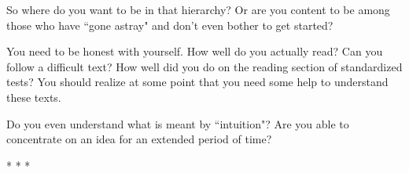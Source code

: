 So where do you want to be in that hierarchy? Or are you content to be among those who have ``gone astray" and don't even bother to get started?

You need to be honest with yourself. How well do you actually read? Can you follow a difficult text? How well did you do on the reading section of standardized tests? You should realize at some point that you need some help to understand these texts.

Do you even understand what is meant by ``intuition"? Are you able to concentrate on an idea for an extended period of time?




\begin{center}* * *\end{center}

